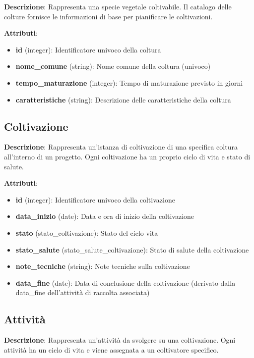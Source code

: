 \documentclass[12pt,a4paper]{article}
\begin{document}
\textbf{Descrizione}: Rappresenta una specie vegetale coltivabile. Il catalogo delle colture fornisce le informazioni di base per pianificare le coltivazioni.

\textbf{Attributi}:
\begin{itemize}[leftmargin=2.5cm]
    \item \textbf{id} (integer): Identificatore univoco della coltura
    \item \textbf{nome\_comune} (string): Nome comune della coltura (univoco)
    \item \textbf{tempo\_maturazione} (integer): Tempo di maturazione previsto in giorni
    \item \textbf{caratteristiche} (string): Descrizione delle caratteristiche della coltura
\end{itemize}

\subsection{Coltivazione}

\textbf{Descrizione}: Rappresenta un'istanza di coltivazione di una specifica coltura all'interno di un progetto. Ogni coltivazione ha un proprio ciclo di vita e stato di salute.

\textbf{Attributi}:
\begin{itemize}[leftmargin=2.5cm]
    \item \textbf{id} (integer): Identificatore univoco della coltivazione
    \item \textbf{data\_inizio} (date): Data e ora di inizio della coltivazione
    \item \textbf{stato} (stato\_coltivazione): Stato del ciclo vita
    \item \textbf{stato\_salute} (stato\_salute\_coltivazione): Stato di salute della coltivazione
    \item \textbf{note\_tecniche} (string): Note tecniche sulla coltivazione
    \item \textbf{data\_fine} (date): Data di conclusione della coltivazione (derivato dalla data\_fine dell'attività di raccolta associata)
\end{itemize}

\subsection{Attività}

\textbf{Descrizione}: Rappresenta un'attività da svolgere su una coltivazione. Ogni attività ha un ciclo di vita e viene assegnata a un coltivatore specifico.
\end{document}
